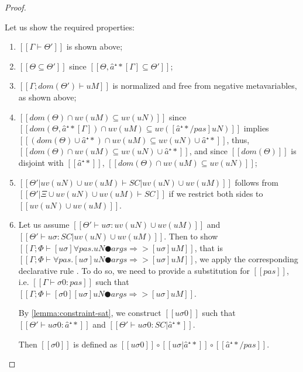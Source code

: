 \begin{proof}
\begin{caseof}
            Let us show the required properties:
            \begin{enumerate}
                \item $[[Γ ⊢ Θ']]$ is shown above;
                \item $[[Θ ⊆ Θ']]$ since $[[Θ, â⁺*[Γ] ⊆ Θ']]$;
                \item $[[Γ; dom(Θ') ⊢  uM]]$ is normalized and free from negative metavariables, as shown above;
                \item $[[dom(Θ) ∩ uv(uM) ⊆ uv(uN)]]$
                    since 
                    $[[dom(Θ, â⁺*[Γ]) ∩ uv(uM) ⊆ uv([â⁺*/pas]uN)]]$
                    implies 
                    $[[(dom(Θ) ∪ {â⁺*}) ∩ uv(uM) ⊆ uv(uN) ∪ {â⁺*}]]$,
                    thus,
                    $[[dom(Θ) ∩ uv(uM) ⊆ uv(uN) ∪ {â⁺*}]]$,
                    and since $[[dom(Θ)]]$ is disjoint with $[[{â⁺*}]]$,
                    $[[dom(Θ) ∩ uv(uM) ⊆ uv(uN)]]$;

                \item $[[Θ'|uv(uN) ∪ uv(uM) ⊢ SC | uv(uN) ∪ uv(uM)]]$ follows from 
                    $[[Θ'|Ξ ∪ uv(uN) ∪ uv(uM) ⊢ SC]]$ if we restrict both sides to 
                    $[[uv(uN) ∪ uv(uM)]]$.
                \item Let us assume $[[ Θ' ⊢ uσ : uv(uN) ∪ uv(uM) ]]$ and
                    $[[ Θ' ⊢ uσ : SC | uv(uN) ∪ uv(uM) ]]$.
                    Then to show $[[ Γ ; Φ ⊢ [uσ]∀pas.uN ● args ⇒> [uσ]uM ]]$,
                    that is $[[ Γ ; Φ ⊢ ∀pas.[uσ]uN ● args ⇒> [uσ]uM ]]$,
                    we apply the corresponding declarative rule .
                    To do so, we need to provide a substitution for $[[pas]]$, 
                    i.e. $[[Γ ⊢ σ0 : pas]]$ such that
                    $[[Γ; Φ ⊢ [σ0][uσ]uN ● args ⇒> [uσ]uM ]]$.

                    By \cref{lemma:constraint-sat},
                    we construct $[[uσ0]]$ such that
                    $[[Θ' ⊢ uσ0 : â⁺*]]$
                    and 
                    $[[Θ' ⊢ uσ0 : SC|{â⁺*}]]$.

                    Then $[[σ0]]$ is defined as 
                    $[[uσ0]] \circ [[uσ|{â⁺*}]] \circ [[â⁺*/pas]]$. 


\end{enumerate}
\end{caseof}
\end{proof}
